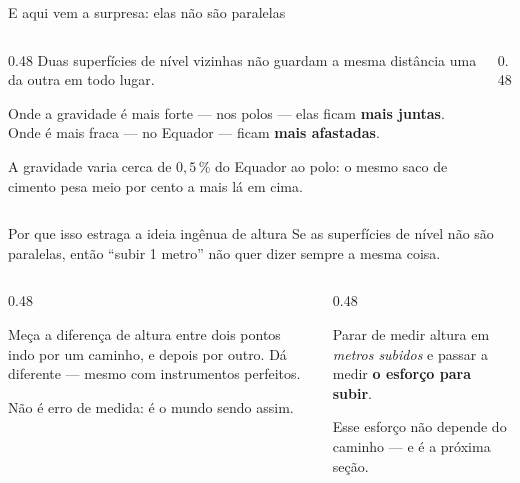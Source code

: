\documentclass[aspectratio=169,11pt]{beamer}
\newcommand{\bnum}[1]{\textbf{\textcolor{mTeal}{#1}}}
\begin{document}
\begin{frame}{E aqui vem a surpresa: elas não são paralelas}
  \begin{columns}[T]
    \begin{column}{0.48\textwidth}
      Duas superfícies de nível vizinhas \alert{não guardam a mesma distância} uma da
      outra em todo lugar.
      \medskip

      Onde a gravidade é mais forte --- nos polos --- elas ficam \bnum{mais juntas}.
      Onde é mais fraca --- no Equador --- ficam \bnum{mais afastadas}.
      \medskip

      {\small A gravidade varia cerca de $0{,}5\,\%$ do Equador ao polo: o mesmo saco de
      cimento pesa meio por cento a mais lá em cima.}
    \end{column}
    \begin{column}{0.48\textwidth}
      \centering
    \end{column}
  \end{columns}
\end{frame}

\begin{frame}{Por que isso estraga a ideia ingênua de altura}
  Se as superfícies de nível não são paralelas, então \alert{``subir 1 metro'' não quer
  dizer sempre a mesma coisa}.
  \bigskip
  \begin{columns}[T]
    \begin{column}{0.48\textwidth}
      \begin{armadilha}[title={O nivelamento que não fecha}]
        Meça a diferença de altura entre dois pontos indo por um caminho, e depois por
        outro. \alert{Dá diferente} --- mesmo com instrumentos perfeitos.
        \medskip

        Não é erro de medida: é o mundo sendo assim.
      \end{armadilha}
    \end{column}
    \begin{column}{0.48\textwidth}
      \begin{ideia}[title={A saída}]
        Parar de medir altura em \emph{metros subidos} e passar a medir
        \bnum{o esforço para subir}.
        \medskip

        Esse esforço não depende do caminho --- e é a próxima seção.
      \end{ideia}
    \end{column}
  \end{columns}
\end{frame}
\end{document}
